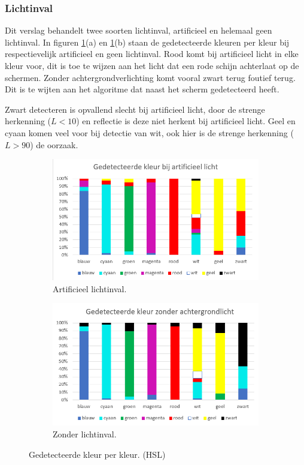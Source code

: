 \subsubsection{Lichtinval}
Dit verslag behandelt twee soorten lichtinval, artificieel en helemaal geen lichtinval. In figuren \ref{fig:lichtinval}(a) en \ref{fig:lichtinval}(b) staan de gedetecteerde kleuren per kleur bij respectievelijk artificieel en geen lichtinval. Rood komt bij artificieel licht in elke kleur voor, dit is toe te wijzen aan het licht dat een rode schijn achterlaat op de schermen. Zonder achtergrondverlichting  komt vooral zwart terug foutief terug. Dit is te wijten aan het algoritme dat naast het scherm gedetecteerd heeft.

Zwart detecteren is opvallend slecht bij artificieel licht, door de strenge herkenning ($L < 10$) en reflectie is deze niet herkent bij artificieel licht. Geel en cyaan komen veel voor bij detectie van wit, ook hier is de strenge herkenning ($L > 90$) de oorzaak.

\begin{figure}
	\begin{subfigure}{0.5\textwidth}
	\centering
	\includegraphics[scale=0.6]{img/artificialLightning}
	\caption{Artificieel lichtinval.}
	\end{subfigure}
	\begin{subfigure}{0.5\textwidth}
	\centering
	\includegraphics[scale=0.6]{img/noneLightning}
	\caption{Zonder lichtinval.}
	\end{subfigure}
	\caption{Gedetecteerde kleur per kleur. (HSL)}
	\label{fig:lichtinval}
\end{figure}

